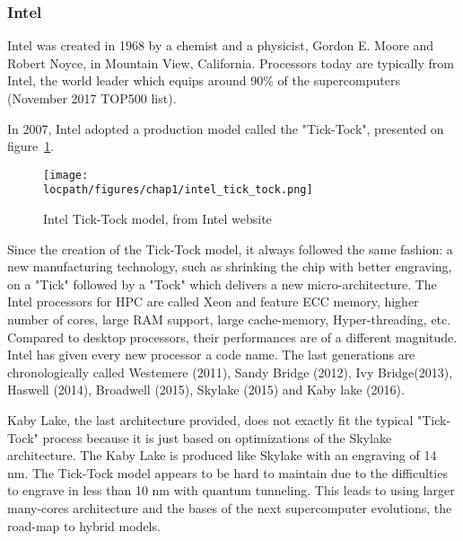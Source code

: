 \subsubsection{Intel}
Intel was created in 1968 by a chemist and a physicist, Gordon E. Moore and Robert Noyce, in Mountain View, California. 
Processors today are typically from Intel, the world leader which equips around 90\% of the supercomputers (November 2017 TOP500 list).

In 2007, Intel adopted a production model called the "Tick-Tock", presented on figure~\ref{fig:1_HPC:intel_tick_tock}.
\begin{figure}[t!]
\begin{center}
\texttt{[image: \\locpath/figures/chap1/intel\_tick\_tock.png]}
\caption{Intel Tick-Tock model, from Intel website \protect\footnotemark}
\label{fig:1_HPC:intel_tick_tock}
\end{center}
\end{figure}
Since the creation of the Tick-Tock model, it always followed the same fashion: a new manufacturing technology, such as shrinking the chip with better engraving, on a "Tick" followed by a "Tock" which delivers a new micro-architecture.
The Intel processors for HPC are called Xeon and feature ECC memory, higher number of cores, large RAM support, large cache-memory, Hyper-threading, etc. 
Compared to desktop processors, their performances are of a different magnitude.
Intel has given every new processor a code name. 
The last generations are chronologically called Westemere (2011), Sandy Bridge (2012), Ivy Bridge(2013), Haswell (2014), Broadwell (2015), Skylake (2015) and Kaby lake (2016). 

Kaby Lake, the last architecture provided, does not exactly fit the typical "Tick-Tock" process because it is just based on optimizations of the Skylake architecture. 
The Kaby Lake is produced like Skylake with an engraving of 14 nm.
The Tick-Tock model appears to be hard to maintain due to the difficulties to engrave in less than 10 nm with quantum tunneling. 
This leads to using larger many-cores architecture and the bases of the next supercomputer evolutions, the road-map to hybrid models. 

